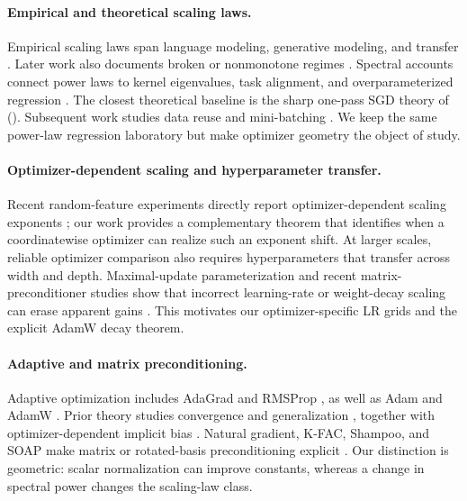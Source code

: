 \documentclass[letterpaper]{article} %
\begin{document}
\paragraph{Empirical and theoretical scaling laws.}
Empirical scaling laws span language modeling, generative modeling, and transfer
\cite{hestness2017deep,rosenfeld2020constructive,kaplan2020scaling,henighan2020scaling,hernandez2021scaling,hoffmann2022training}.
Later work also documents broken or nonmonotone regimes \cite{caballero2023broken}.
Spectral accounts connect power laws to kernel eigenvalues, task alignment, and overparameterized regression
\cite{bordelon2020spectrum,canatar2021spectral,bahri2024explaining,simon2024more}.
The closest theoretical baseline is the sharp one-pass SGD theory of
\citeauthor{lin2024scaling} (\citeyear{lin2024scaling}).
Subsequent work studies data reuse and mini-batching
\cite{lin2025datareuse,chen2026minibatch}.
We keep the same power-law regression laboratory but make optimizer geometry the object of study.

\paragraph{Optimizer-dependent scaling and hyperparameter transfer.}
Recent random-feature experiments directly report optimizer-dependent scaling exponents \cite{ramani2026optimizer}; our work provides a complementary theorem that identifies when a coordinatewise optimizer can realize such an exponent shift.
At larger scales, reliable optimizer comparison also requires hyperparameters that transfer across width and depth.  Maximal-update parameterization and recent matrix-preconditioner studies show that incorrect learning-rate or weight-decay scaling can erase apparent gains
\cite{yang2021tensor,qiu2025hyperparameter}.
This motivates our optimizer-specific LR grids and the explicit AdamW decay theorem.

\paragraph{Adaptive and matrix preconditioning.}
Adaptive optimization includes AdaGrad and RMSProp
\cite{duchi2011adaptive,tieleman2012rmsprop}, as well as Adam and AdamW
\cite{kingma2015adam,loshchilov2019decoupled}.
Prior theory studies convergence and generalization
\cite{reddi2018convergence,wilson2017marginal}, together with optimizer-dependent implicit bias
\cite{zhang2024implicit,vasudeva2025rich}.
Natural gradient, K-FAC, Shampoo, and SOAP make matrix or rotated-basis preconditioning explicit
\cite{amari1998natural,martens2015optimizing,gupta2018shampoo,vyas2025soap}.
Our distinction is geometric: scalar normalization can improve constants, whereas a change in spectral power changes the scaling-law class.
\end{document}
